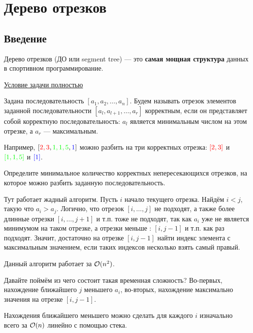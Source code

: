 \section{Дерево отрезков}

\subsection{Введение}

Дерево отрезков (ДО или segment tree) --- это {\bf самая мощная структура} данных в спортивном программирование.


\down

\href{https://codeforces.com/gym/102154/problem/B}{Условие задачи полностью}


\down

Задана последовательность $[a_1, a_2, \dots, a_n]$. Будем называть отрезок элементов заданной последовательности $[a_l, a_{l + 1}, \dots, a_r]$ корректным, если он представляет собой корректную последовательность: $a_l$ является минимальным числом на этом отрезке, а $a_r$ — максимальным.

Например, $[{\color{red}{2,3}}, {\color{green}{1,1,5}}, {\color{blue}{1}}]$ можно разбить на три корректных отрезка: ${\color{red}{[2,3]}}$ и ${\color{green}{[1,1,5]}}$ и ${\color{blue}{[1]}}$.

\down

Определите минимальное количество корректных непересекающихся отрезков, на которое можно разбить заданную последовательность. 

\down

Тут работает жадный алгоритм. Пусть $i$ начало текущего отрезка. Найдём $i < j$, такую что $a_i > a_j$. Логично, что отрезок $[i, \dots, j]$ не подходят, а также более длинные отрезки $[i, \dots, j + 1]$ и т.п. тоже не подходят, так как $a_i$ уже не является минимумом на таком отрезке, а отрезки меньше : $[i, j - 1]$ и т.п. как раз подходят. Значит, достаточно на отрезке $[i, j - 1]$ найти индекс элемента с максимальным значением, если таких индексов несколько взять самый правый.

Данный алгоритм работает за $ \mathcal{O}(n^2)$.

\down

Давайте поймём из чего состоит такая временная сложность? Во-первых, нахождение ближайшего $j$ меньшего $a_i$, во-вторых, нахождение максимально значения на отрезке $[i, j - 1]$.

Нахождения ближайшего меньшего можно сделать для каждого $i$ изначально всего за $ \mathcal{O}(n)$ линейно с помощью стека.

